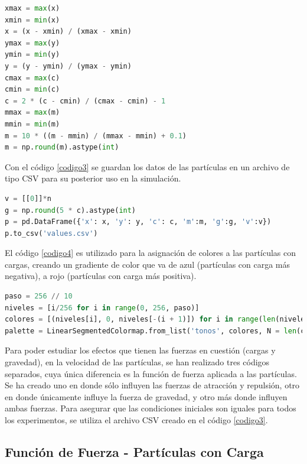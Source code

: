 \documentclass{report}
\begin{document}
\begin{lstlisting}[caption={Distribuci\'on de Part\'iculas, Cargas y Masas}, label=codigo2, language=Python]
xmax = max(x)
xmin = min(x)
x = (x - xmin) / (xmax - xmin)
ymax = max(y)
ymin = min(y)
y = (y - ymin) / (ymax - ymin) 
cmax = max(c)
cmin = min(c)
c = 2 * (c - cmin) / (cmax - cmin) - 1
mmax = max(m)
mmin = min(m)
m = 10 * ((m - mmin) / (mmax - mmin) + 0.1)
m = np.round(m).astype(int)
\end{lstlisting}

Con el c\'odigo \ref{codigo3} se guardan los datos de las part\'iculas en un archivo de tipo CSV para su posterior uso en la simulaci\'on.

\begin{lstlisting}[caption=Guardado de Datos de Part\'iculas, label=codigo3, language=Python]
v = [[0]]*n
g = np.round(5 * c).astype(int)
p = pd.DataFrame({'x': x, 'y': y, 'c': c, 'm':m, 'g':g, 'v':v})
p.to_csv('values.csv')
\end{lstlisting}

El c\'odigo \ref{codigo4} es utilizado para la asignaci\'on de colores a las part\'iculas con cargas, creando un gradiente de color que va de azul (part\'iculas con carga m\'as negativa), a rojo (part\'iculas con carga m\'as positiva).

\begin{lstlisting}[caption=Gradiente de Color para Part\'iculas con Carga, label=codigo4, language=Python]
paso = 256 // 10
niveles = [i/256 for i in range(0, 256, paso)]
colores = [(niveles[i], 0, niveles[-(i + 1)]) for i in range(len(niveles))]
palette = LinearSegmentedColormap.from_list('tonos', colores, N = len(colores))
\end{lstlisting}

Para poder estudiar los efectos que tienen las fuerzas en cuesti\'on (cargas y gravedad), en la velocidad de las part\'iculas, se han realizado tres c\'odigos separados, cuya \'unica diferencia es la funci\'on de fuerza aplicada a las part\'iculas. Se ha creado uno en donde s\'olo influyen las fuerzas de atracci\'on y repulsi\'on, otro en donde \'unicamente influye la fuerza de gravedad, y otro m\'as donde influyen ambas fuerzas. Para asegurar que las condiciones iniciales son iguales para todos los experimentos, se utiliza el archivo CSV creado en el c\'odigo \ref{codigo3}.

\subsection{Funci\'on de Fuerza - Part\'iculas con Carga}
\end{document}
